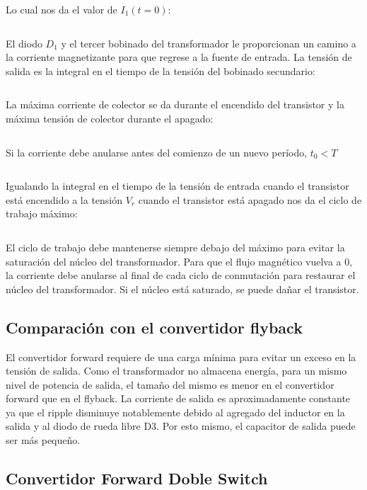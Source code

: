 $$  $$

Lo cual nos da el valor de $I_1(t=0)$:

$$  $$

El diodo $D_1$ y el tercer bobinado del transformador le proporcionan un camino 
a la corriente magnetizante para que regrese a la fuente de entrada. 
La tensión de salida es la integral en el tiempo de la tensión del bobinado secundario:

$$  $$

La máxima corriente de colector se da durante el encendido del transistor y la máxima tensión de colector durante el apagado:

$$  $$

Si la corriente debe anularse antes del comienzo de un nuevo período, 
$t_0<T$

$$  $$


Igualando la integral en el tiempo de la tensión de entrada cuando el transistor está encendido a la tensión $V_r$ cuando el transistor está apagado nos da el ciclo de trabajo máximo:

$$  $$

El ciclo de trabajo debe mantenerse siempre debajo del máximo para evitar la saturación del núcleo del transformador. 
Para que el flujo magnético vuelva a 0, la corriente debe anularse
 al final de cada ciclo de conmutación para restaurar el núcleo del transformador. 
Si el núcleo está saturado, se puede dañar el transistor. 

\subsection{Comparación con el convertidor flyback}

El convertidor forward requiere de una carga mínima para evitar un exceso en la tensión de salida. 
Como el transformador no almacena energía, para un mismo nivel de potencia de salida, 
el tamaño del mismo es menor en el convertidor forward que en el flyback. 
La corriente de salida es aproximadamente constante ya que el ripple disminuye notablemente 
debido al agregado del inductor en la salida y al diodo de rueda libre D3.
Por esto mismo, el capacitor de salida puede ser más pequeño. 


\subsection{Convertidor Forward Doble Switch}

